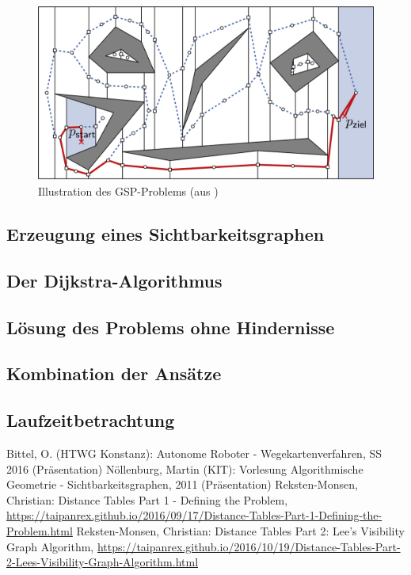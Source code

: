 \documentclass[a4paper, notitlepage, 12pt]{scrartcl}
\begin{document}
 \begin{figure}[H]
 	\includegraphics[scale=0.41]{pics/gsp}
 	\caption{Illustration des GSP-Problems (aus \cite{Src:noem})}
 \end{figure}
 \subsection{Erzeugung eines Sichtbarkeitsgraphen}
 \subsection{Der Dijkstra-Algorithmus}
 \subsection{Lösung des Problems ohne Hindernisse}
 \subsection{Kombination der Ansätze}
 \subsection{Laufzeitbetrachtung}
\begin{thebibliography}{xx}
 Bittel, O. (HTWG Konstanz): Autonome Roboter - Wegekartenverfahren, SS 2016 (Präsentation)
 Nöllenburg, Martin (KIT): Vorlesung Algorithmische Geometrie - Sichtbarkeitsgraphen, 2011 (Präsentation)
 Reksten-Monsen, Christian: Distance Tables Part 1 - Defining the Problem, \url{https://taipanrex.github.io/2016/09/17/Distance-Tables-Part-1-Defining-the-Problem.html}
 Reksten-Monsen, Christian: Distance Tables Part 2: Lee's Visibility Graph Algorithm, \url{https://taipanrex.github.io/2016/10/19/Distance-Tables-Part-2-Lees-Visibility-Graph-Algorithm.html}
\end{thebibliography}
\end{document}

